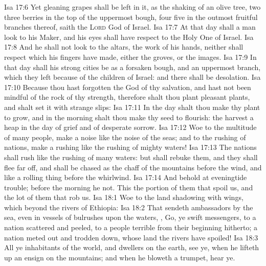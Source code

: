 \vs Isa 17:6 Yet gleaning grapes shall be left in it, as the shaking of an olive tree, two  three berries in the top of the uppermost bough, four  five in the outmost fruitful branches thereof, saith the \textsc{Lord} God of Israel.
\vs Isa 17:7 At that day shall a man look to his Maker, and his eyes shall have respect to the Holy One of Israel.
\vs Isa 17:8 And he shall not look to the altars, the work of his hands, neither shall respect  which his fingers have made, either the groves, or the images.
\vs Isa 17:9 In that day shall his strong cities be as a forsaken bough, and an uppermost branch, which they left because of the children of Israel: and there shall be desolation.
\vs Isa 17:10 Because thou hast forgotten the God of thy salvation, and hast not been mindful of the rock of thy strength, therefore shalt thou plant pleasant plants, and shalt set it with strange slips:
\vs Isa 17:11 In the day shalt thou make thy plant to grow, and in the morning shalt thou make thy seed to flourish:  the harvest  a heap in the day of grief and of desperate sorrow.
\vs Isa 17:12 Woe to the multitude of many people,  make a noise like the noise of the seas; and to the rushing of nations,  make a rushing like the rushing of mighty waters!
\vs Isa 17:13 The nations shall rush like the rushing of many waters: but  shall rebuke them, and they shall flee far off, and shall be chased as the chaff of the mountains before the wind, and like a rolling thing before the whirlwind.
\vs Isa 17:14 And behold at eveningtide trouble;  before the morning he  not. This  the portion of them that spoil us, and the lot of them that rob us.
\vs Isa 18:1 Woe to the land shadowing with wings, which  beyond the rivers of Ethiopia:
\vs Isa 18:2 That sendeth ambassadors by the sea, even in vessels of bulrushes upon the waters, , Go, ye swift messengers, to a nation scattered and peeled, to a people terrible from their beginning hitherto; a nation meted out and trodden down, whose land the rivers have spoiled!
\vs Isa 18:3 All ye inhabitants of the world, and dwellers on the earth, see ye, when he lifteth up an ensign on the mountains; and when he bloweth a trumpet, hear ye.
